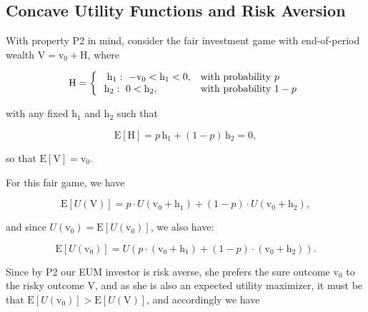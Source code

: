 \documentclass[graybox,envcountchap,sectrefs]{svmono}\usepackage[]{graphicx}\usepackage[]{xcolor}
\begin{document}
\begin{appendices}
\section{Concave Utility Functions and Risk Aversion}

With property P2 in mind, consider the fair investment game with end-of-period
wealth $\mathrm{V}=\mathrm{v}_{0}+\mathrm{H}$, where

\begin{equation}
\mathrm{H}=\left\{ \begin{array}{cl}
\,\,\,\mathrm{h}_{1}:\ -\mathrm{v}_{0}<\mathrm{h}_{1}<0, & \mbox{with probability \ensuremath{p}}\\
\mathrm{h}_{2}:\ 0<\mathrm{h}_{2},\ \ \ \ \ \ \ \ \ \, & \mbox{with probability \ensuremath{1-p}}
\end{array}\right.\label{eq: fairGame}
\end{equation}

with any fixed $\mathrm{h}_{1}$ and $\mathrm{h}_{2}$ such that

\begin{equation}
\mathrm{E}\left[\mathrm{H}\right]=p\,\mathrm{h}_{1}+(1-p)\,\mathrm{h}_{2}=0,\label{eq:E_H_eq_0}
\end{equation}

so that $\mathrm{E}\left[\mathrm{V}\right]=\mathrm{v}_{0}$. 

For this fair game, we have

\begin{equation}
\mathrm{E}\left[U\left(\mathrm{V}\right)\right]=p\cdot U\left(\mathrm{v}_{0}+\mathrm{h}_{1}\right)+\left(1-p\right)\cdot U\left(\mathrm{v}_{0}+\mathrm{h}_{2}\right),\label{eq:E_U_of_V}
\end{equation}

and since $U(\mathrm{v}_{0})=\mathrm{E}\left[U(\mathrm{v}_{0})\right]$,
we also have:

\begin{equation}
\mathrm{E}\left[U(\mathrm{v}_{0})\right]=U\left(p\cdot\left(\mathrm{v}_{0}+\mathrm{h}_{1}\right)+\left(1-p\right)\cdot\left(\mathrm{v}_{0}+\mathrm{h}_{2}\right)\right).\label{eq:E_U_of_V_0}
\end{equation}

Since by P2 our EUM investor is risk averse, she prefers the sure
outcome $\mathrm{v}_{0}$ to the risky outcome $\mathrm{V}$, and
as she is also an expected utility maximizer, it must be that $\mathrm{E}\left[U(\mathrm{v}_{0})\right]>\mathrm{E}\left[U(\mathrm{V})\right]$,
and accordingly we have


\end{appendices}
\end{document}
